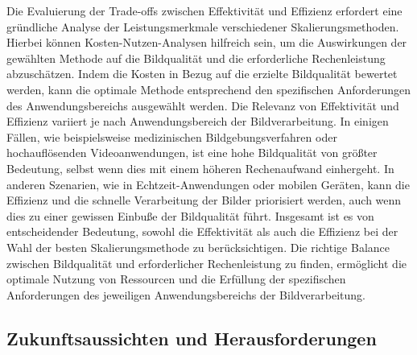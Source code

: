        Die Evaluierung der Trade-offs zwischen Effektivität und Effizienz erfordert eine gründliche Analyse der Leistungsmerkmale verschiedener Skalierungsmethoden.
        Hierbei können Kosten-Nutzen-Analysen hilfreich sein, um die Auswirkungen der gewählten Methode auf die Bildqualität und die erforderliche Rechenleistung abzuschätzen. 
        Indem die Kosten in Bezug auf die erzielte Bildqualität bewertet werden, kann die optimale Methode entsprechend den spezifischen Anforderungen des Anwendungsbereichs ausgewählt werden.
        Die Relevanz von Effektivität und Effizienz variiert je nach Anwendungsbereich der Bildverarbeitung. 
        In einigen Fällen, wie beispielsweise medizinischen Bildgebungsverfahren oder hochauflösenden Videoanwendungen, ist eine hohe Bildqualität von größter Bedeutung, selbst wenn dies mit einem höheren Rechenaufwand einhergeht. 
        In anderen Szenarien, wie in Echtzeit-Anwendungen oder mobilen Geräten, kann die Effizienz und die schnelle Verarbeitung der Bilder priorisiert werden, auch wenn dies zu einer gewissen Einbuße der Bildqualität führt.
        Insgesamt ist es von entscheidender Bedeutung, sowohl die Effektivität als auch die Effizienz bei der Wahl der besten Skalierungsmethode zu berücksichtigen. 
        Die richtige Balance zwischen Bildqualität und erforderlicher Rechenleistung zu finden, ermöglicht die optimale Nutzung von Ressourcen und die Erfüllung der spezifischen Anforderungen des jeweiligen Anwendungsbereichs der Bildverarbeitung.

    \subsection{Zukunftsaussichten und Herausforderungen}
    
